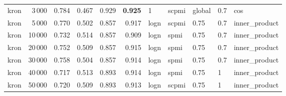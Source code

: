 \begin{tabular}{lrrrrrlllll}
    kron &            3\,000 &  0.784 &  0.467 &      0.929 &          \textbf{0.925} &     1 &  scpmi &  global &  0.7 &            cos \\
    kron &            5\,000 &  0.770 &  0.502 &      0.857 &          0.917 &  logn &  scpmi &    0.75 &  0.7 &  inner\_product \\
    kron &           10\,000 &  0.732 &  0.514 &      0.857 &          0.909 &  logn &   spmi &    0.75 &  0.7 &  inner\_product \\
    kron &           20\,000 &  0.752 &  0.509 &      0.857 &          0.915 &  logn &   spmi &    0.75 &  0.7 &  inner\_product \\
    kron &           30\,000 &  0.758 &  0.504 &      0.857 &          0.914 &  logn &   spmi &    0.75 &  0.7 &  inner\_product \\
    kron &           40\,000 &  0.717 &  0.513 &      0.893 &          0.914 &  logn &   spmi &    0.75 &    1 &  inner\_product \\
    kron &           50\,000 &  0.720 &  0.509 &      0.893 &          0.913 &  logn &  scpmi &    0.75 &    1 &  inner\_product \\
\bottomrule
\end{tabular}
